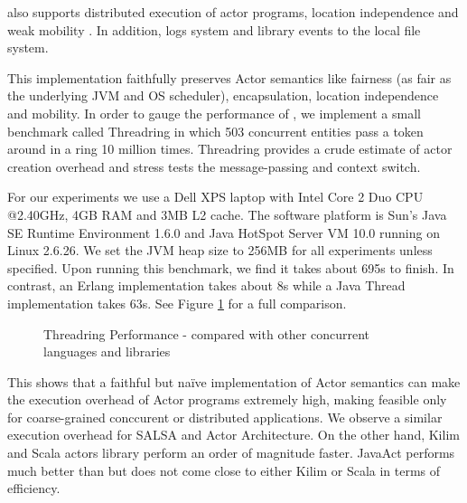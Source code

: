 \oaf{} also supports distributed execution of actor programs, location independence and weak mobility \cite{mobility}. In addition, \oaf{} logs system and library events to the local file system. 


This implementation faithfully preserves Actor semantics like fairness (as fair as the underlying JVM and OS scheduler), encapsulation, location independence and mobility. In order to gauge the performance of \oaf{}, we implement a small benchmark called Threadring \cite{lang-shootout} in which 503 concurrent entities pass a token around in a ring 10 million times. Threadring provides a crude estimate of actor creation overhead and stress tests the message-passing and context switch. 

For our experiments we use a Dell XPS laptop with Intel Core\texttrademark{} 2 Duo CPU @2.40GHz, 4GB RAM and 3MB L2 cache. The software platform is Sun's Java\texttrademark{} SE Runtime Environment 1.6.0 and Java HotSpot\texttrademark{} Server VM 10.0 running on Linux 2.6.26. We set the JVM heap size to 256MB for all experiments unless specified. Upon running this benchmark, we find it takes about 695s to finish. In contrast, an Erlang implementation takes about 8s while a Java Thread implementation takes 63s. See Figure \ref{tr_performance_orig_af} for a full comparison.
\begin{figure}%
\centerline
{
}
\caption{Threadring Performance - \oaf{} compared with other concurrent languages and libraries}
\label{tr_performance_orig_af}
\end{figure}
This shows that a faithful but na\"ive implementation of Actor semantics can make the execution overhead of Actor programs extremely high, making \oaf{} feasible only for coarse-grained conccurent or distributed applications. We observe a similar execution overhead for SALSA and Actor Architecture. On the other hand, Kilim and Scala actors library perform an order of magnitude faster. JavaAct performs much better than \oaf{} but does not come close to either Kilim or Scala in terms of efficiency.

